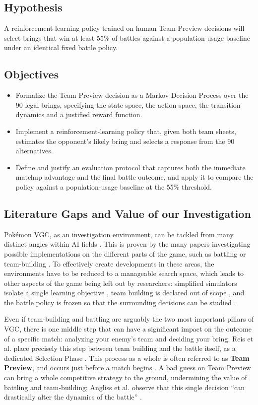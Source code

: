\documentclass[conference]{IEEEtran}
\begin{document}
\subsection{Hypothesis}
A reinforcement-learning policy trained on human Team Preview decisions will select brings that win at least 55\% of battles against a population-usage baseline under an identical fixed battle policy. 
\subsection{Objectives}
\begin{itemize}
\item Formalize the Team Preview decision as a Markov Decision Process over
the 90 legal brings, specifying the state space, the action space, the
transition dynamics and a justified reward function.
\item Implement a reinforcement-learning policy that, given both team sheets,
estimates the opponent's likely bring and selects a response from the 90
alternatives.
\item Define and justify an evaluation protocol that captures both the
immediate matchup advantage and the final battle outcome, and apply it to
compare the policy against a population-usage baseline at the 55\% threshold.
\end{itemize}

\subsection{Literature Gaps and Value of our Investigation}

Pok\'emon VGC, as an investigation environment, can be tackled from many
distinct angles within AI fields \cite{hu2024}. This is proven by the many
papers investigating possible implementations on the different parts of the
game, such as battling \cite{simoes2020, huang2019, grigsby2025, karten2026} or
team-building \cite{reis2024}. To effectively create developments in these
areas, the environments have to be reduced to a manageable search space, which
leads to other aspects of the game being left out by researchers: simplified
simulators isolate a single learning objective \cite{simoes2020}, team building
is declared out of scope \cite{angliss2026}, and the battle policy is frozen so
that the surrounding decisions can be studied \cite{reis2024, reis2025}.

Even if team-building and battling are arguably the two most important pillars
of VGC, there is one middle step that can have a significant impact on the
outcome of a specific match: analyzing your enemy's team and deciding your
bring. Reis et al. place precisely this step between team building and the
battle itself, as a dedicated Selection Phase \cite{reis2021}. This process as a
whole is often referred to as \textbf{Team Preview}, and occurs just before a
match begins \cite{vgchandbook}. A bad guess on Team Preview can bring a whole
competitive strategy to the ground, undermining the value of battling and
team-building; Angliss et al. observe that this single decision ``can
drastically alter the dynamics of the battle'' \cite{angliss2026}.
\end{document}
